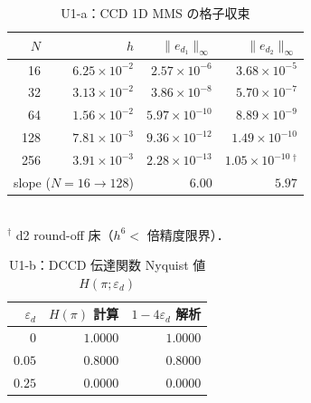 \begin{table}[htbp]
\caption{U1-a：CCD 1D MMS の格子収束}
\label{tab:U1_ccd_periodic}
\centering\small
\begin{tabular}{r r r r}
\toprule
$N$ & $h$ & $\|e_{d_1}\|_\infty$ & $\|e_{d_2}\|_\infty$ \\
\midrule
16  & $6.25\times 10^{-2}$ & $2.57\times 10^{-6}$ & $3.68\times 10^{-5}$ \\
32  & $3.13\times 10^{-2}$ & $3.86\times 10^{-8}$ & $5.70\times 10^{-7}$ \\
64  & $1.56\times 10^{-2}$ & $5.97\times 10^{-10}$ & $8.89\times 10^{-9}$ \\
128 & $7.81\times 10^{-3}$ & $9.36\times 10^{-12}$ & $1.49\times 10^{-10}$ \\
256 & $3.91\times 10^{-3}$ & $2.28\times 10^{-13}$ & $1.05\times 10^{-10}\,^\dagger$ \\
\midrule
\multicolumn{2}{r}{slope ($N=16\!\to\!128$)} & $\mathbf{6.00}$ & $\mathbf{5.97}$ \\
\bottomrule
\end{tabular}
\\[2pt]
{\footnotesize $^\dagger$ d2 round-off 床（$h^6 \!<\!$ 倍精度限界）．}
\end{table}

\begin{table}[htbp]
\caption{U1-b：DCCD 伝達関数 Nyquist 値 \texorpdfstring{$H(\pi; \varepsilon_d)$}{H(pi; eps_d)}}
\label{tab:U1_dccd_nyquist}
\centering\small
\begin{tabular}{r r r}
\toprule
$\varepsilon_d$ & $H(\pi)$ 計算 & $1-4\varepsilon_d$ 解析 \\
\midrule
$0$    & $1.0000$ & $1.0000$ \\
$0.05$ & $0.8000$ & $0.8000$ \\
$0.25$ & $0.0000$ & $0.0000$ \\
\bottomrule
\end{tabular}
\end{table}

